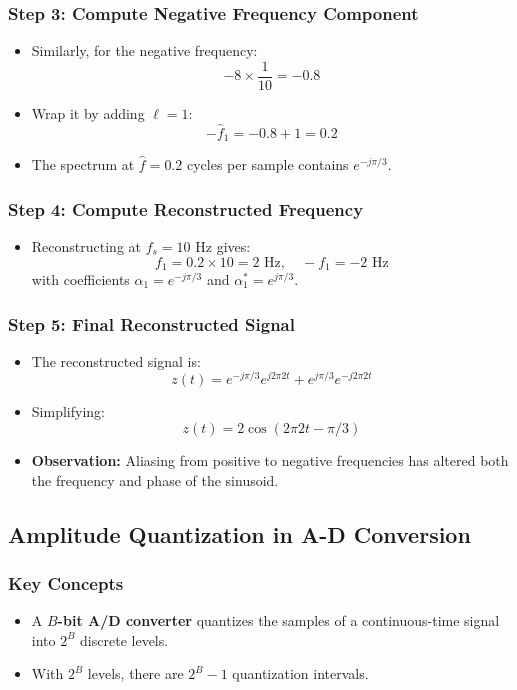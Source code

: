 \documentclass[12pt, letterpaper]{article}
\begin{document}
\subsubsection{Step 3: Compute Negative Frequency Component}
\begin{itemize}
    \item Similarly, for the negative frequency:
    \[
    -8 \times \frac{1}{10} = -0.8
    \]
    \item Wrap it by adding \( \ell = 1 \):
    \[
    -\hat{f}_1 = -0.8 + 1 = 0.2
    \]
    \item The spectrum at \( \hat{f} = 0.2 \) cycles per sample contains \( e^{-j\pi/3} \).
\end{itemize}

\subsubsection{Step 4: Compute Reconstructed Frequency}
\begin{itemize}
    \item Reconstructing at \( f_s = 10 \) Hz gives:
    \[
    f_1 = 0.2 \times 10 = 2 \text{ Hz}, \quad -f_1 = -2 \text{ Hz}
    \]
    with coefficients \( \alpha_1 = e^{-j\pi/3} \) and \( \alpha_1^* = e^{j\pi/3} \).
\end{itemize}

\subsubsection{Step 5: Final Reconstructed Signal}
\begin{itemize}
    \item The reconstructed signal is:
    \[
    z(t) = e^{-j\pi/3} e^{j 2\pi 2t} + e^{j\pi/3} e^{-j 2\pi 2t}
    \]
    \item Simplifying:
    \[
    z(t) = 2 \cos(2\pi 2t - \pi/3)
    \]
    \item \textbf{Observation:} Aliasing from positive to negative frequencies has altered both the frequency and phase of the sinusoid.
\end{itemize}

\subsection{Amplitude Quantization in A-D Conversion}

\subsubsection{Key Concepts}
\begin{itemize}
    \item A \textbf{\( B \)-bit A/D converter} quantizes the samples of a continuous-time signal into \( 2^B \) discrete levels.
    \item With \( 2^B \) levels, there are \( 2^B - 1 \) quantization intervals.
\end{itemize}
\end{document}
